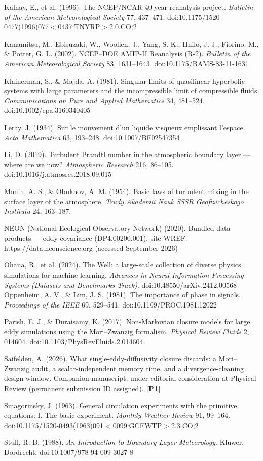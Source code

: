 \documentclass[11pt]{article}
\begin{document}
Kalnay, E., et al. (1996). The NCEP/NCAR 40-year reanalysis project. \emph{Bulletin of the American Meteorological Society} 77, 437--471. doi:10.1175/\hspace{0pt}1520-0477(1996)077$<$0437:TNYRP$>$2.0.CO;2

Kanamitsu, M., Ebisuzaki, W., Woollen, J., Yang, S.-K., Hnilo, J. J., Fiorino, M., \& Potter, G. L. (2002). NCEP--DOE AMIP-II Reanalysis (R-2). \emph{Bulletin of the American Meteorological Society} 83, 1631--1643. doi:10.1175/BAMS-83-11-1631

Klainerman, S., \& Majda, A. (1981). Singular limits of quasilinear hyperbolic systems with large parameters and the incompressible limit of compressible fluids. \emph{Communications on Pure and Applied Mathematics} 34, 481--524. doi:10.1002/cpa.3160340405

Leray, J. (1934). Sur le mouvement d'un liquide visqueux emplissant l'espace. \emph{Acta Mathematica} 63, 193--248. doi:10.1007/\hspace{0pt}BF02547354

Li, D. (2019). Turbulent Prandtl number in the atmospheric boundary layer --- where are we now? \emph{Atmospheric Research} 216, 86--105. doi:10.1016/j.atmosres.2018.09.015

Monin, A. S., \& Obukhov, A. M. (1954). Basic laws of turbulent mixing in the surface layer of the atmosphere. \emph{Trudy Akademii Nauk SSSR Geofizicheskogo Instituta} 24, 163--187.

NEON (National Ecological Observatory Network) (2020). Bundled data products --- eddy covariance (DP4.00200.001), site WREF. https://data.neonscience.org (accessed September 2026)

Ohana, R., et al. (2024). The Well: a large-scale collection of diverse physics simulations for machine learning. \emph{Advances in Neural Information Processing Systems (Datasets and Benchmarks Track)}. doi:10.48550/arXiv.2412.00568
Oppenheim, A. V., \& Lim, J. S. (1981). The importance of phase in signals. \emph{Proceedings of the IEEE} 69, 529--541. doi:10.1109/PROC.1981.12022

Parish, E. J., \& Duraisamy, K. (2017). Non-Markovian closure models for large eddy simulations using the Mori--Zwanzig formalism. \emph{Physical Review Fluids} 2, 014604. doi:10.1103/\hspace{0pt}PhysRevFluids.2.014604

Saifelden, A. (2026). What single-eddy-diffusivity closure discards: a Mori--Zwanzig audit, a scalar-independent memory time, and a divergence-cleaning design window. Companion manuscript, under editorial consideration at Physical Review (permanent submission ID assigned). \textbf{[P1]}

Smagorinsky, J. (1963). General circulation experiments with the primitive equations: I. The basic experiment. \emph{Monthly Weather Review} 91, 99--164. doi:10.1175/\hspace{0pt}1520-0493(1963)091$<$0099:GCEWTP$>$2.3.CO;2

Stull, R. B. (1988). \emph{An Introduction to Boundary Layer Meteorology}. Kluwer, Dordrecht. doi:10.1007/\hspace{0pt}978-94-009-3027-8
\endgroup
\end{document}

